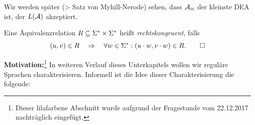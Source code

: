 Wir werden später (\-> Satz von Myhill-Nerode) sehen, dass $\mathcal{A}_\equiv$ der kleinste \acs*{DEA} ist, der $L(\mathcal{A})$ akzeptiert.

\begin{Def}[name={[Rechtskongruente Äquivalenzrelation]}]
        Eine Äquivalenzrelation $R\subseteq\Sigma^*\times\Sigma^*$ heißt \emph{rechtskongruent}, falls
        \[
        (u,v)\in R \quad\=>\quad \forall w\in\Sigma^*: (u\cdot w,v\cdot w) \in R.
        \qedhere
        \]
\end{Def}

{\color{violet}
\textbf{Motivation:}\footnote{Dieser lilafarbene Abschnitt wurde aufgrund der Fragestunde vom 22.12.2017 nachträglich eingefügt.}
In weiteren Verlauf dieses Unterkapitels wollen wir reguläre Sprachen charakterisieren.
Informell ist die Idee dieser Charakterisierung die folgende:

}
